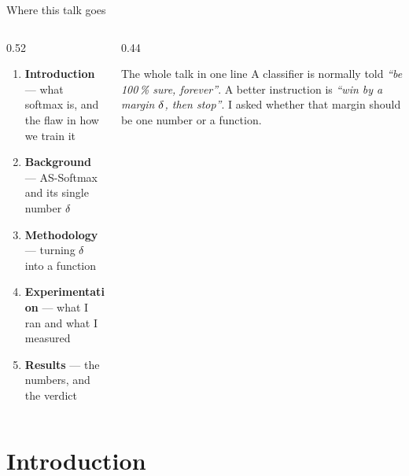 \begin{frame}{Where this talk goes}
  \begin{columns}[T]
    \begin{column}{0.52\textwidth}
      \small
      \begin{enumerate}\setlength\itemsep{0.55em}
        \item \textbf{Introduction} --- what softmax is, and the flaw in how we train it
        \item \textbf{Background} --- AS-Softmax and its single number $\delta$
        \item \textbf{Methodology} --- turning $\delta$ into a function
        \item \textbf{Experimentation} --- what I ran and what I measured
        \item \textbf{Results} --- the numbers, and the verdict
      \end{enumerate}
    \end{column}
    \begin{column}{0.44\textwidth}
      \small
      \begin{block}{The whole talk in one line}
        A classifier is normally told \emph{``be 100\,\% sure, forever''}.
        A better instruction is \emph{``win by a margin $\delta$, then stop''}.
        I asked whether that margin should be \alert{one number} or \alert{a function}.
      \end{block}
    \end{column}
  \end{columns}
\end{frame}

\section{Introduction}

